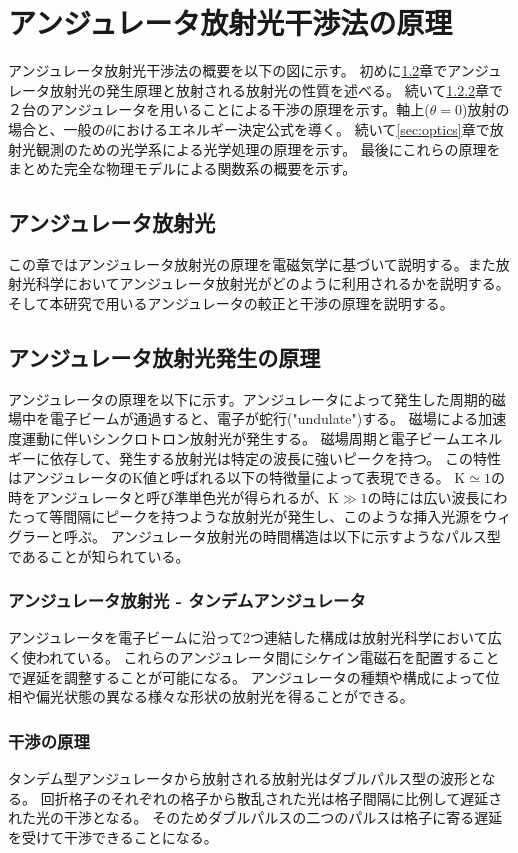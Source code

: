 \documentclass[a4paper,11pt,uplatex]{jsbook}
\begin{document}
\chapter{アンジュレータ放射光干渉法の原理}
アンジュレータ放射光干渉法の概要を以下の図に示す。
初めに\ref{sec:undulator}章でアンジュレータ放射光の発生原理と放射される放射光の性質を述べる。
続いて\ref{sec:interference}章で２台のアンジュレータを用いることによる干渉の原理を示す。軸上($\theta =0$)放射の場合と、一般の$\theta$におけるエネルギー決定公式を導く。
続いて\ref{sec:optics}章で放射光観測のための光学系による光学処理の原理を示す。
最後にこれらの原理をまとめた完全な物理モデルによる関数系の概要を示す。
\section{アンジュレータ放射光}
この章ではアンジュレータ放射光の原理を電磁気学に基づいて説明する。また放射光科学においてアンジュレータ放射光がどのように利用されるかを説明する。
そして本研究で用いるアンジュレータの較正と干渉の原理を説明する。
\section{アンジュレータ放射光発生の原理}\label{sec:undulator}
アンジュレータの原理を以下に示す。アンジュレータによって発生した周期的磁場中を電子ビームが通過すると、電子が蛇行("undulate")する。
磁場による加速度運動に伴いシンクロトロン放射光が発生する。
磁場周期と電子ビームエネルギーに依存して、発生する放射光は特定の波長に強いピークを持つ。
この特性はアンジュレータのK値と呼ばれる以下の特徴量によって表現できる。
$\text{K} \simeq 1$の時をアンジュレータと呼び準単色光が得られるが、$\text{K} \gg 1$の時には広い波長にわたって等間隔にピークを持つような放射光が発生し、このような挿入光源をウィグラーと呼ぶ。
アンジュレータ放射光の時間構造は以下に示すようなパルス型であることが知られている。
\subsection{アンジュレータ放射光 - タンデムアンジュレータ}
アンジュレータを電子ビームに沿って2つ連結した構成は放射光科学において広く使われている。
これらのアンジュレータ間にシケイン電磁石を配置することで遅延を調整することが可能になる。
アンジュレータの種類や構成によって位相や偏光状態の異なる様々な形状の放射光を得ることができる。
\subsection{干渉の原理}\label{sec:interference}
タンデム型アンジュレータから放射される放射光はダブルパルス型の波形となる。
回折格子のそれぞれの格子から散乱された光は格子間隔に比例して遅延された光の干渉となる。
そのためダブルパルスの二つのパルスは格子に寄る遅延を受けて干渉できることになる。
\end{document}
